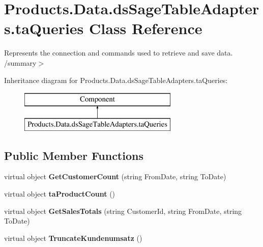 \hypertarget{class_products_1_1_data_1_1ds_sage_table_adapters_1_1ta_queries}{}\section{Products.\+Data.\+ds\+Sage\+Table\+Adapters.\+ta\+Queries Class Reference}
\label{class_products_1_1_data_1_1ds_sage_table_adapters_1_1ta_queries}


Represents the connection and commands used to retrieve and save data. /summary$>$  


Inheritance diagram for Products.\+Data.\+ds\+Sage\+Table\+Adapters.\+ta\+Queries\+:\begin{figure}[H]
\begin{center}
\leavevmode
\includegraphics[height=2.000000cm]{class_products_1_1_data_1_1ds_sage_table_adapters_1_1ta_queries}
\end{center}
\end{figure}
\subsection*{Public Member Functions}
\begin{DoxyCompactItemize}
\item 
virtual object {\bfseries Get\+Customer\+Count} (string From\+Date, string To\+Date)\hypertarget{class_products_1_1_data_1_1ds_sage_table_adapters_1_1ta_queries_ab39e95a57ade5e7dcfdb5778051b8e48}{}\label{class_products_1_1_data_1_1ds_sage_table_adapters_1_1ta_queries_ab39e95a57ade5e7dcfdb5778051b8e48}

\item 
virtual object {\bfseries ta\+Product\+Count} ()\hypertarget{class_products_1_1_data_1_1ds_sage_table_adapters_1_1ta_queries_ae9f3c21d072397b460523785c5a6741d}{}\label{class_products_1_1_data_1_1ds_sage_table_adapters_1_1ta_queries_ae9f3c21d072397b460523785c5a6741d}

\item 
virtual object {\bfseries Get\+Sales\+Totals} (string Customer\+Id, string From\+Date, string To\+Date)\hypertarget{class_products_1_1_data_1_1ds_sage_table_adapters_1_1ta_queries_acf6094ca030e58c1dea7b0d6498868b2}{}\label{class_products_1_1_data_1_1ds_sage_table_adapters_1_1ta_queries_acf6094ca030e58c1dea7b0d6498868b2}

\item 
virtual object {\bfseries Truncate\+Kundenumsatz} ()\hypertarget{class_products_1_1_data_1_1ds_sage_table_adapters_1_1ta_queries_a1b021ed76837921db7f71503f2f39696}{}\label{class_products_1_1_data_1_1ds_sage_table_adapters_1_1ta_queries_a1b021ed76837921db7f71503f2f39696}

\end{DoxyCompactItemize}
